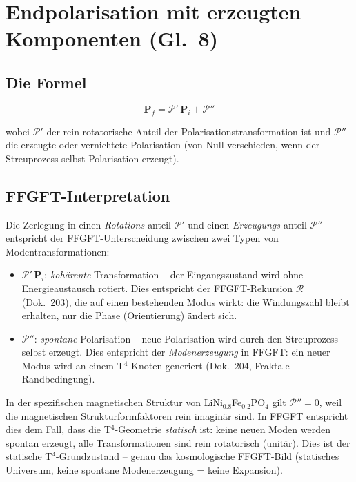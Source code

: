 \section{Endpolarisation mit erzeugten Komponenten (Gl.~8)}

\subsection*{Die Formel}

\begin{equation}
  \mathbf{P}_f = \mathcal{P}'\,\mathbf{P}_i + \mathcal{P}''
  \tag{Ref.~Gl.~8}
\end{equation}

\noindent wobei $\mathcal{P}'$ der rein rotatorische Anteil der
Polarisationstransformation ist und $\mathcal{P}''$ die erzeugte oder
vernichtete Polarisation (von Null verschieden, wenn der Streuprozess selbst
Polarisation erzeugt).

\subsection*{FFGFT-Interpretation}

Die Zerlegung in einen \emph{Rotations-}anteil $\mathcal{P}'$ und einen
\emph{Erzeugungs-}anteil $\mathcal{P}''$ entspricht der FFGFT-Unterscheidung
zwischen zwei Typen von Modentransformationen:
\begin{itemize}
  \item $\mathcal{P}'\,\mathbf{P}_i$: \emph{kohärente} Transformation --
        der Eingangszustand wird ohne Energieaustausch rotiert. Dies
        entspricht der FFGFT-Rekursion $\mathcal{R}$ (Dok.~203), die auf
        einen bestehenden Modus wirkt: die Windungszahl bleibt erhalten,
        nur die Phase (Orientierung) ändert sich.
  \item $\mathcal{P}''$: \emph{spontane} Polarisation -- neue Polarisation
        wird durch den Streuprozess selbst erzeugt. Dies entspricht der
        \emph{Modenerzeugung} in FFGFT: ein neuer Modus wird an einem
        T$^4$-Knoten generiert (Dok.~204, Fraktale Randbedingung).
\end{itemize}

\noindent In der spezifischen magnetischen Struktur von
LiNi$_{0.8}$Fe$_{0.2}$PO$_4$ gilt $\mathcal{P}''=0$, weil die magnetischen
Strukturformfaktoren rein imaginär sind. In FFGFT entspricht dies dem Fall,
dass die T$^4$-Geometrie \emph{statisch} ist: keine neuen Moden werden
spontan erzeugt, alle Transformationen sind rein rotatorisch (unitär). Dies
ist der statische T$^4$-Grundzustand -- genau das kosmologische FFGFT-Bild
(statisches Universum, keine spontane Modenerzeugung = keine Expansion).


